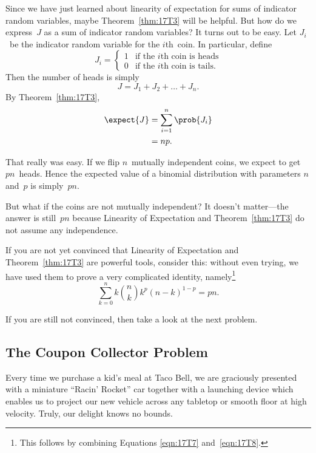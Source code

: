 Since we have just learned about linearity of expectation for sums of
indicator random variables, maybe Theorem~\ref{thm:17T3} will be
helpful.  But how do we express~$J$ as a sum of indicator random
variables?  It turns out to be easy.  Let $J_i$~be the indicator
random variable for the $i$th~coin.  In particular, define
\begin{equation*}
J_i = \begin{cases}
        1 & \text{if the $i$th coin is heads} \\
        0 & \text{if the $i$th coin is tails}.
      \end{cases}
\end{equation*}
Then the number of heads is simply
\begin{equation*}
    J = J_1 + J_2 + \dots + J_n.
\end{equation*}
By Theorem~\ref{thm:17T3},
\begin{align}
\expect{J}
    &= \sum_{i = 1}^n \prob{J_i} \notag\\
    &= np. \label{eqn:17T8}
\end{align}

That really was easy.  If we flip $n$~mutually independent coins, we
expect to get $pn$~heads.  Hence the expected value of a binomial
distribution with parameters $n$ and~$p$ is simply~$pn$.

But what if the coins are not mutually independent?  It doesn't
matter---the answer is still~$p n$ because Linearity of Expectation
and Theorem~\ref{thm:17T3} do not assume any independence.

If you are not yet convinced that Linearity of Expectation and
Theorem~\ref{thm:17T3} are powerful tools, consider this: without even
trying, we have used them to prove a very complicated identity,
namely\footnote{This follows by combining Equations \ref{eqn:17T7}
  and~\ref{eqn:17T8}.}
\begin{equation*}
    \sum_{k = 0}^n k \binom{n}{k} k^p (n - k)^{1 - p} = p n.
\end{equation*}

If you are still not convinced, then take a look at the next problem.

\subsection{The Coupon Collector Problem}

Every time we purchase a kid's meal at Taco Bell, we are graciously
presented with a miniature ``Racin' Rocket'' car together with a
launching device which enables us to project our new vehicle across
any tabletop or smooth floor at high velocity.  Truly, our delight
knows no bounds.


